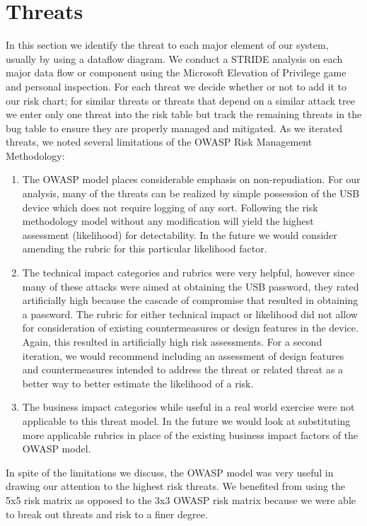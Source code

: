 \section{Threats}
\label{sec:threats}
In this section we identify the threat to each major element of our
system, usually by using a dataflow diagram.  We conduct a STRIDE analysis on each major data flow or component using the Microsoft Elevation of Privilege game and personal inspection.  For each threat we decide whether or not to add it to our risk chart; for similar threats or threats that depend on a similar attack tree we enter only one threat into the risk table but track the remaining threats in the bug table to ensure they are properly managed and mitigated. As we iterated threats, we noted several limitations of the OWASP Risk Management Methodology:
\begin{enumerate}
    \item{The OWASP model places considerable emphasis on non-repudiation.  For our analysis, many of the threats can be realized by simple possession of the USB device which does not require logging of any sort.  Following the risk methodology model without any modification will yield the highest assessment (likelihood) for detectability. In the future we would consider amending the rubric for this particular likelihood factor.}
    \item{The technical impact categories and rubrics were very helpful, however since many of these attacks were aimed at obtaining the USB password, they rated artificially high because the cascade of compromise that resulted in obtaining a password. The rubric for either technical impact or likelihood did not allow for consideration of existing countermeasures or design features in the device.  Again, this resulted in artificially high risk assessments.  For a second iteration, we would recommend including an assessment of design features and countermeasures intended to address the threat or related threat as a better way to better estimate the likelihood of a risk.}
    \item{The business impact categories while useful in a real world exercise were not applicable to this threat model.  In the future we would look at substituting more applicable rubrics in place of the existing business impact factors of the OWASP model.}
\end{enumerate}

In spite of the limitations we discuss, the OWASP model was very useful in drawing our attention to the highest risk threats.  We benefited from using the 5x5 risk matrix as opposed to the 3x3 OWASP risk matrix because we were able to break out threats and risk to a finer degree.

